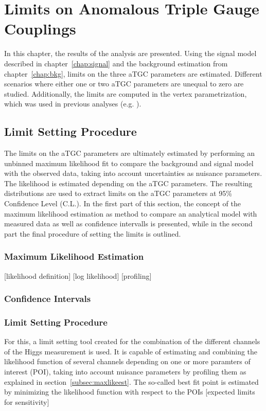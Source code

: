 \chapter{Limits on Anomalous Triple Gauge Couplings}
\label{chap:LimitsonATGCs}


In this chapter, the results of the analysis are presented. Using the signal model described in chapter~\ref{chap:signal} and the background estimation from chapter~\ref{chap:bkg}, limits on the three aTGC parameters are estimated. Different scenarios where either one or two aTGC parameters are unequal to zero are studied. Additionally, the limits are computed in the vertex parametrization, which was used in previous analyses (e.g. \cite{aTGC1,aTGC2}).


\section{Limit Setting Procedure}
The limits on the aTGC parameters are ultimately estimated by performing an unbinned maximum likelihood fit to compare the background and signal model with the observed data, taking into account uncertainties as nuisance parameters. The likelihood is estimated depending on the aTGC parameters. The resulting distributions are used to extract limits on the aTGC parameters at 95\% Confidence Level (C.L.). In the first part of this section, the concept of the maximum likelihood estimation as method to compare an analytical model with measured data as well as confidence intervalls is presented, while in the second part the final procedure of setting the limits is outlined.
\subsection{Maximum Likelihood Estimation}
[likelihood definition]
[log likelihood]
[profiling]
\subsection{Confidence Intervals}
\subsection{Limit Setting Procedure}

For this, a limit setting tool \cite{combine} created for the combination of the different channels of the Higgs measurement \cite{higgs_comb} is used. It is capable of estimating and combining the likelihood function of several channels depending on one or more paramters of interest (POI), taking into account nuisance parameters by profiling them as explained in section~\ref{subsec:maxlikeest}. The so-called best fit point is estimated by minimizing the likelihood function with respect to the POIs
[expected limits for sensitivity]

